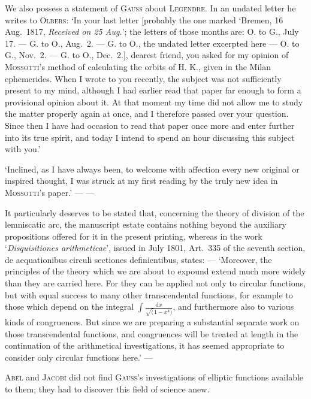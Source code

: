 We also possess a statement of \textsc{Gauss} about \textsc{Legendre}. In an undated letter he writes to \textsc{Olbers}: ‘In your last letter [probably the one marked ‘Bremen, 16 Aug.\ 1817, \textit{Received on 25 Aug.}’; the letters of those months are: O. to G., July 17. --- G. to O., Aug.\ 2. --- G. to O., the undated letter excerpted here --- O. to G., Nov.\ 2. --- G. to O., Dec.\ 2.], dearest friend, you asked for my opinion of \textsc{Mossotti}’s method of calculating the orbits of H. K., given in the Milan ephemerides. When I wrote to you recently, the subject was not sufficiently present to my mind, although I had earlier read that paper far enough to form a provisional opinion about it. At that moment my time did not allow me to study the matter properly again at once, and I therefore passed over your question. Since then I have had occasion to read that paper once more and enter further into its true spirit, and today I intend to spend an hour discussing this subject with you.’

‘Inclined, as I have always been, to welcome with affection every new original or inspired thought, I was struck at my first reading by the truly new idea in \textsc{Mossotti}’s paper.’ --- ---

\medskip


\medskip
It particularly deserves to be stated that, concerning the theory of division of the lemniscatic arc, the manuscript estate contains nothing beyond the auxiliary propositions offered for it in the present printing, whereas in the work ‘\textit{Disquisitiones arithmeticae}’, issued in July 1801, Art.\ 335 of the seventh section, de aequationibus circuli sectiones definientibus, states: --- ‘Moreover, the principles of the theory which we are about to expound extend much more widely than they are carried here. For they can be applied not only to circular functions, but with equal success to many other transcendental functions, for example to those which depend on the integral \(\displaystyle\int\frac{\mathrm{d}x}{\surd(1-x^{4})}\), and furthermore also to various kinds of congruences. But since we are preparing a substantial separate work on those transcendental functions, and congruences will be treated at length in the continuation of the arithmetical investigations, it has seemed appropriate to consider only circular functions here.’ ---

\textsc{Abel} and \textsc{Jacobi} did not find \textsc{Gauss}’s investigations of elliptic functions available to them; they had to discover this field of science anew.

